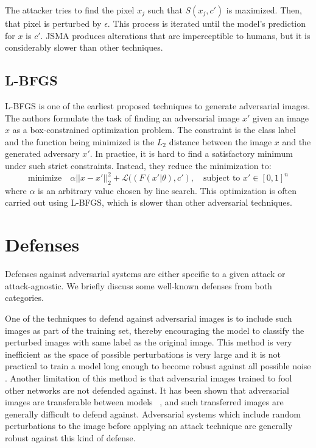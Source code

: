 The attacker tries to find the pixel {$x_j$} such that $S(x_j,c')$ is maximized. 
Then, that pixel is perturbed by $\epsilon$. 
This process is iterated until the model's prediction for $x$ is $c'$. 
JSMA produces alterations that are imperceptible to humans, but it is considerably slower than other techniques.

\subsection{L-BFGS}
L-BFGS \cite{Szegedy2013IntriguingPO} is one of the earliest proposed techniques to generate adversarial images.
The authors formulate the task of finding an adversarial image $x'$ given an image $x$ as a box-constrained optimization problem.
The constraint is the class label and the function being minimized is the $L_2$ distance between the image $x$ and the generated adversary $x'$.
In practice, it is hard to find a satisfactory minimum under such strict constraints. Instead, they reduce the minimization to:
\[
\text{minimize} \quad \alpha || x - x' ||_2^2 + \mathcal{L}((F(x'|\theta),c'),\quad \text{subject to } x' \in [0,1]^n 
\]
where $\alpha$ is an arbitrary value chosen by line search. 
This optimization is often carried out using L-BFGS, which is slower than other adversarial techniques.

\section{Defenses} \label{defenses}
Defenses against adversarial systems are either specific to a given attack or attack-agnostic. 
We briefly discuss some well-known defenses from both categories.

One of the techniques to defend against adversarial images is to include such images as part of the training set, thereby encouraging the model to classify the perturbed images with same label as the original image. 
This method is very inefficient as the space of possible perturbations is very large and it is not practical to train
a model long enough to become robust against all possible noise \cite{Tramr2017TheSO}. 
Another limitation of this method is that adversarial images trained to fool other networks are not defended against. 
It has been shown that adversarial images are transferable between models ~\cite{Liu2016DelvingIT}, and such transferred images are generally difficult to defend against.
Adversarial systems which include random perturbations to the image before applying an attack technique are generally robust against
this kind of defense.

